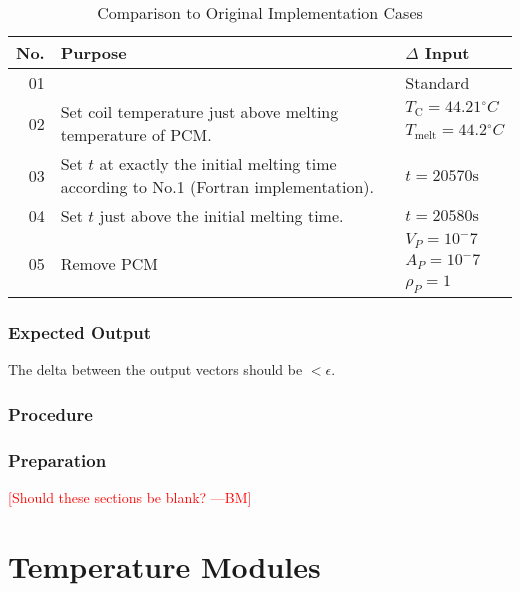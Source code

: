 \documentclass[12pt]{article}
\newcommand{\authornote}[3]{\textcolor{#1}{[#3 ---#2]}}
\newcommand{\authornote}[3]{}
\newcommand{\bmac}[1]{\authornote{red}{BM}{#1}}
\newcommand{\degree}{\ensuremath{^\circ}}
\begin{document}
 \begin{center}
	\begin{longtable}{ | r | p{4cm} | p{4cm} |}
	\caption{Comparison to Original Implementation Cases} \\ \hline \label{TblOrigImplement} 
	No. & Purpose & $\Delta$ Input \\ \hline
	01 & & Standard \\ \hline
	\multirow{3}{*}{02} & \multirow{3}{*}{\parbox{4cm}{Set coil temperature just above melting temperature of PCM.}} & $T_{\text{C}} = 44.21\degree{C}$ \\
	& & $T_{\text{melt}} = 44.2\degree{C}$ \\
	& & \\ \hline
	03 & Set $t$ at exactly the initial melting time according to No.1 (Fortran
	 implementation). & $t = 20570\text{s}$ \\ \hline
	04 & Set $t$ just above the initial melting time. & $t = 20580\text{s}$ \\ \hline
	\multirow{3}{*}{05} & \multirow{3}{*}{Remove PCM} & $V_P = 10^-7$\\
	& & $A_P = 10^-7$ \\
	& & $\rho_P = 1$ \\ \hline
	\end{longtable}
\end{center}
 
\subsubsection{Expected Output}
The delta between the output vectors should be
 $< \epsilon$.

\subsubsection{Procedure}


\subsubsection{Preparation}

\bmac{Should these sections be blank?}

%
%
\section{Temperature Modules}
\end{document}

